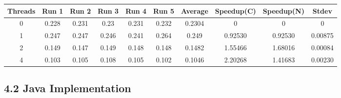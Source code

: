 \begin{itemize}
\begin{center}
\begin{adjustbox}{width=\columnwidth, center}
\begin{tabular}{ | |c | c c c c c | c | c c | c | |}
 Threads & Run 1 & Run 2 & Run 3 & Run 4 & Run 5 & Average & Speedup(C) & Speedup(N) & Stdev \\ [0.5ex] 
 \hline 
 \hline 
0& 0.228 & 0.231 & 0.23 & 0.231 & 0.232 & 0.2304 & 0 & 0 & 0\\ 
 \hline
1& 0.247 & 0.247 & 0.246 & 0.241 & 0.264 & 0.249 & 0.92530 & 0.92530 & 0.00875\\ 
 \hline
2& 0.149 & 0.147 & 0.149 & 0.148 & 0.148 & 0.1482 & 1.55466 & 1.68016 & 0.00084\\ 
 \hline
4& 0.103 & 0.105 & 0.108 & 0.105 & 0.102 & 0.1046 & 2.20268 & 1.41683 & 0.00230\\ 
 \hline
\end{tabular} \end{adjustbox} \end{center}\end{itemize}\subsection*{4.2 Java Implementation}
